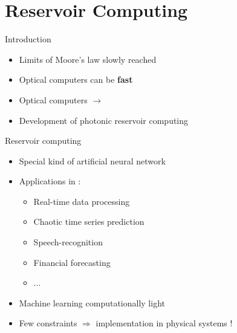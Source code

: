 \section{Reservoir Computing}

\begin{frame}{Introduction}
	\begin{itemize}
		\item Limits of Moore's law slowly reached
		\item Optical computers can be \textbf{fast}
		\item Optical computers $\longrightarrow$ 
		\item Development of \alert{photonic reservoir computing}
	\end{itemize}
\end{frame}

\begin{frame}{Reservoir computing}

	\begin{itemize}
		\item Special kind of artificial neural network
		\item Applications in :
		\begin{itemize}
			\item Real-time data processing
			\item Chaotic time series prediction
			\item Speech-recognition
			\item Financial forecasting
			\item ...
		\end{itemize}
		\item Machine learning computationally light
		\item Few constraints $\Longrightarrow$ \alert{implementation in physical systems !}
	\end{itemize}

\end{frame}

